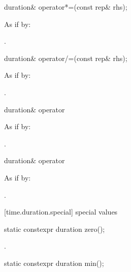%
\begin{itemdecl}
duration& operator*=(const rep& rhs);
\end{itemdecl}

\begin{itemdescr}
\pnum
\effects As if by: 

\pnum
\returns {}.
\end{itemdescr}

%
\begin{itemdecl}
duration& operator/=(const rep& rhs);
\end{itemdecl}

\begin{itemdescr}
\pnum
\effects As if by: 

\pnum
\returns {}.
\end{itemdescr}

%
\begin{itemdecl}
duration& operator%
\end{itemdecl}

\begin{itemdescr}
\pnum
\effects As if by: 

\pnum
\returns {}.
\end{itemdescr}

%
\begin{itemdecl}
duration& operator%
\end{itemdecl}

\begin{itemdescr}
\pnum
\effects As if by: 

\pnum
\returns {}.
\end{itemdescr}


[time.duration.special]{ special values}

%
\begin{itemdecl}
static constexpr duration zero();
\end{itemdecl}

\begin{itemdescr}
\pnum
\returns {}.
\end{itemdescr}

%
\begin{itemdecl}
static constexpr duration min();
\end{itemdecl}

